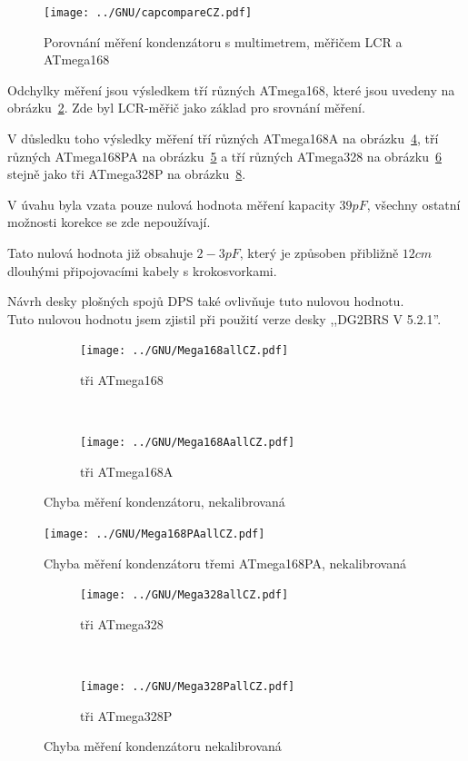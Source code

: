 \begin{figure}[H]
\centering
\texttt{[image: ../GNU/capcompareCZ.pdf]}
\caption{Porovnání měření kondenzátoru s multimetrem, měřičem LCR a ATmega168}
\label{fig:capcompare}
\end{figure}

Odchylky měření jsou výsledkem tří různých ATmega168, které jsou uvedeny na obrázku~\ref{fig:mega168all}.
Zde byl LCR-měřič jako základ pro srovnání měření.

V důsledku toho výsledky měření tří různých ATmega168A na obrázku~\ref{fig:mega168Aall}, 
tří různých ATmega168PA na obrázku~\ref{fig:mega168PAall}  a tří různých
ATmega328 na obrázku~\ref{fig:mega328all} stejně jako tři ATmega328P na obrázku~\ref{fig:mega328Pall}.

V úvahu byla vzata pouze nulová hodnota měření kapacity \(39pF\), všechny ostatní možnosti korekce se zde
nepoužívají.

Tato nulová hodnota již obsahuje \(2-3pF\), který je způsoben přibližně \(12cm\) dlouhými připojovacími kabely s krokosvorkami.

Návrh desky plošných spojů DPS také ovlivňuje tuto nulovou hodnotu.\\ Tuto nulovou hodnotu jsem zjistil při použití verze desky ,,DG2BRS V 5.2.1''.

\begin{figure}[H]
  \begin{subfigure}[b]{9cm}
    \centering
    \texttt{[image: ../GNU/Mega168allCZ.pdf]}
    \caption{tři ATmega168}
    \label{fig:mega168all}
  \end{subfigure}
  ~
  \begin{subfigure}[b]{9cm}
    \centering
    \texttt{[image: ../GNU/Mega168AallCZ.pdf]}
    \caption{tři ATmega168A}
    \label{fig:mega168Aall}
  \end{subfigure}
  \caption{Chyba měření kondenzátoru, nekalibrovaná}
\end{figure}

\begin{figure}[H]
\centering
\texttt{[image: ../GNU/Mega168PAallCZ.pdf]}
\caption{Chyba měření kondenzátoru třemi ATmega168PA, nekalibrovaná}
\label{fig:mega168PAall}
\end{figure}

\begin{figure}[H]
  \begin{subfigure}[b]{9cm}
    \centering
    \texttt{[image: ../GNU/Mega328allCZ.pdf]}
    \caption{tři ATmega328}
    \label{fig:mega328all}
  \end{subfigure}
  ~
  \begin{subfigure}[b]{9cm}
    \centering
    \texttt{[image: ../GNU/Mega328PallCZ.pdf]}
    \caption{tři ATmega328P}
    \label{fig:mega328Pall}
  \end{subfigure}
  \caption{Chyba měření kondenzátoru nekalibrovaná}
\end{figure}

